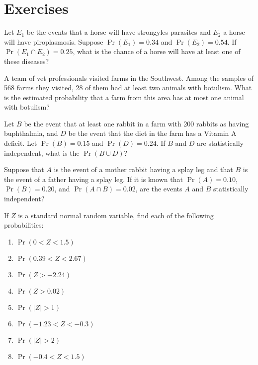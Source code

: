 \section{Exercises}
\label{exercisesChapterProbability}
\begin{problem} %
  Let $E_1$ be the events that a horse will have 
  strongyles parasites and $E_2$ a horse will have
  piroplasmosis. Suppose $\Pr (E_1) = 0.34$ and $\Pr (E_2) = 0.54$. If
  $\Pr (E_1\cap E_2) = 0.25$, what is the chance of a horse will have
  at least one of these diseases?
\end{problem}


\begin{problem} %
  A team of vet professionals visited farms in the Southwest. Among
  the samples of 568 farms they visited, 28 of them had at least two
  animals with botulism. What is the estimated probability that a
  farm from this area has at most one animal with botulism?
\end{problem}
\begin{problem} %
  Let $B$ be the event that at least one  rabbit in a farm with 200 rabbits as having
  buphthalmia, and $D$ be the event that the diet in the farm has a
 Vitamin A deficit.	Let
  $\Pr ( B)	= 0.15$	and	$\Pr( D )	=	0.24$.	If
  $B$	and	$D$	are	statistically independent, what is the
  $\Pr (B \cup D)$?
\end{problem}


\begin{problem} %
Suppose that $A$ is the event of a mother rabbit having  a splay leg
and that $B$ is the event of a father having a splay leg. If it is known that $\Pr (A) = 0.10$, $\Pr (B) = 0.20$, and $\Pr ( A\cap B ) = 0.02$, are the events $A$ and $B$ statistically independent?
\end{problem}

\begin{problem}
   If $Z$ is a standard normal random variable, find each of the
following probabilities: 
\begin{multicols}{3} 
  \begin{enumerate}\renewcommand{\theenumi}{\roman{enumi}}
  \item $\Pr(0<Z<1.5)$ 
   \item $\Pr(0.39<Z<2.67)$
   \item $\Pr(Z>-2.24)$
   \item $\Pr(Z>0.02)$
   \item $\Pr(|Z| > 1)$
   \item $\Pr(-1.23<Z<-0.3)$
   \item $\Pr(|Z|>2)$
   \item $\Pr(-0.4<Z<1.5)$
   \end{enumerate}
   \end{multicols}
\end{problem}

